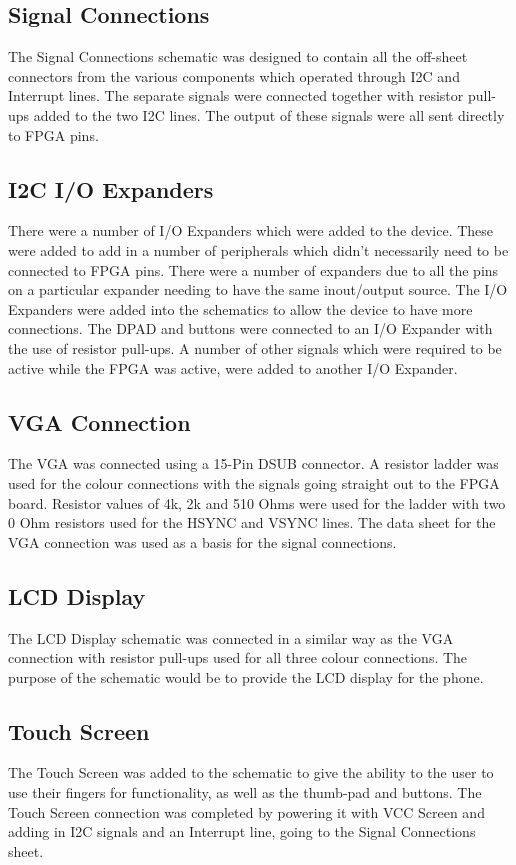 \subsection{Signal Connections}

	The Signal Connections schematic was designed to contain all the off-sheet connectors from the various components which operated through I2C and Interrupt lines. The separate signals were connected together with resistor pull-ups added to the two I2C lines. The output of these signals were all sent directly to FPGA pins. 

\subsection{I2C I/O Expanders}

	There were a number of I/O Expanders which were added to the device. These were added to add in a number of peripherals which didn't necessarily need to be connected to FPGA pins. There were a number of expanders due to all the pins on a particular expander needing to have the same inout/output source. 
The I/O Expanders were added into the schematics to allow the device to have more connections. The DPAD and buttons were connected to an I/O Expander with the use of resistor pull-ups. A number of other signals which were required to be active while the FPGA was active, were added to another I/O Expander.

\subsection{VGA Connection}
\label{chap:VGA}
	The VGA was connected using a 15-Pin DSUB connector. A resistor ladder was used for the colour connections with the signals going straight out to the FPGA board. Resistor values of 4k, 2k and 510 Ohms were used for the ladder with two 0 Ohm resistors used for the HSYNC and VSYNC lines. The data sheet for the VGA connection was used as a basis for the signal connections. 
 
\subsection{LCD Display}
\label{chap:LCD}
	The LCD Display schematic was connected in a similar way as the VGA connection with resistor pull-ups used for all three colour connections. The purpose of the schematic would be to provide the LCD display for the phone.

\subsection{Touch Screen}
\label{chap:touch}
	The Touch Screen was added to the schematic to give the ability to the user to use their fingers for functionality, as well as the thumb-pad and buttons. 
The Touch Screen connection was completed by powering it with VCC Screen and adding in I2C signals and an Interrupt line, going to the Signal Connections sheet.

